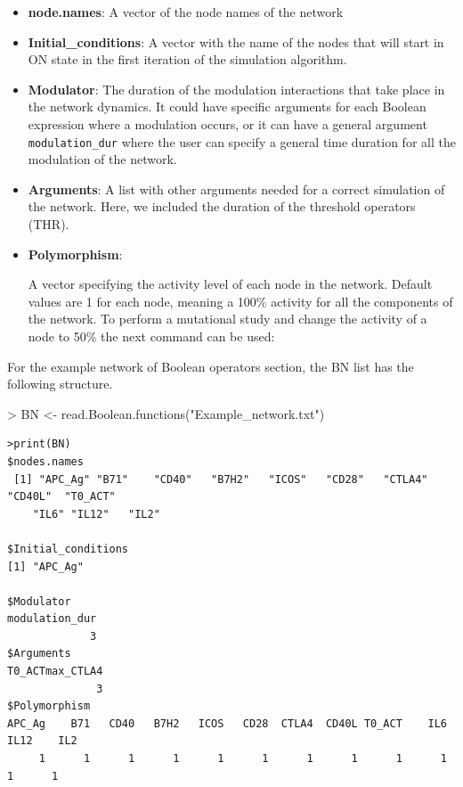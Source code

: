 \documentclass[a4paper]{article}
\begin{document}
\begin{itemize}
\item{\textbf{node.names}:}{ A vector of the node names of the network}
\item{\textbf{Initial\_conditions}:}{ A vector with the name of the nodes that will start in ON state in the first iteration of the simulation algorithm.}
\item{\textbf{Modulator}:}{ The duration of the modulation interactions that take place in the network dynamics. It could have specific arguments for each Boolean expression where a modulation occurs, or it can have a general argument \texttt{modulation\_dur} where the user can specify a general time duration for all the modulation of the network.}
\item{\textbf{Arguments}:}{ A list with other arguments needed for a correct simulation of the network. Here, we included the duration of the threshold operators (THR). }
\item{\textbf{Polymorphism}:}{ A vector specifying the activity level of each node in the network. Default values are 1 for each node, meaning a 100\% activity for all the components of the network. To perform a mutational study and change the activity of a node to 50\% the next command can be used: 
\begin{Schunk}
\end{Schunk}
}
\end{itemize}

For the example network of Boolean operators section, the BN list has the following structure.
\begin{Schunk}
\begin{Sinput}
> BN <- read.Boolean.functions("Example_network.txt")
\end{Sinput}
\end{Schunk}
\begin{verbatim}
>print(BN)
$nodes.names
 [1] "APC_Ag" "B71"    "CD40"   "B7H2"   "ICOS"   "CD28"   "CTLA4"  "CD40L"  "T0_ACT"
    "IL6" "IL12"   "IL2"

$Initial_conditions
[1] "APC_Ag"

$Modulator
modulation_dur
             3
$Arguments
T0_ACTmax_CTLA4 
              3 
$Polymorphism
APC_Ag    B71   CD40   B7H2   ICOS   CD28  CTLA4  CD40L T0_ACT    IL6   IL12    IL2 
     1      1      1      1      1      1      1      1      1      1      1      1 

\end{verbatim}
\end{document}
